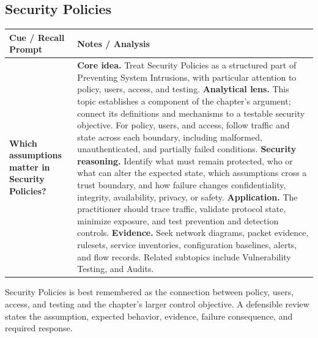 \documentclass[11pt]{article}
\newcommand{\CornellHeader}{%
\rowcolor{Navy}\color{white}\bfseries Cue / Recall Prompt & \color{white}\bfseries Notes / Analysis\\\hline}
\newcommand{\CornellRow}[2]{%
\cellcolor{CueGray}\RaggedRight\textbf{#1} & \RaggedRight #2\\\hline}
\begin{document}
\subsection*{Security Policies}
\begin{longtable}{>{\RaggedRight\arraybackslash}p{}|>{\RaggedRight\arraybackslash}p{}}
\CornellHeader
\CornellRow{Which assumptions matter in Security Policies?}{\textbf{Core idea.} Treat Security Policies as a structured part of Preventing System Intrusions, with particular attention to policy, users, access, and testing. \textbf{Analytical lens.} This topic establishes a component of the chapter's argument; connect its definitions and mechanisms to a testable security objective. For policy, users, and access, follow traffic and state across each boundary, including malformed, unauthenticated, and partially failed conditions. \textbf{Security reasoning.} Identify what must remain protected, who or what can alter the expected state, which assumptions cross a trust boundary, and how failure changes confidentiality, integrity, availability, privacy, or safety. \textbf{Application.} The practitioner should trace traffic, validate protocol state, minimize exposure, and test prevention and detection controls. \textbf{Evidence.} Seek network diagrams, packet evidence, rulesets, service inventories, configuration baselines, alerts, and flow records. Related subtopics include Vulnerability Testing, and Audits.}
\end{longtable}
\begin{topicsummary}
Security Policies is best remembered as the connection between policy, users, access, and testing and the chapter's larger control objective. A defensible review states the assumption, expected behavior, evidence, failure consequence, and required response.
\end{topicsummary}
\end{document}
